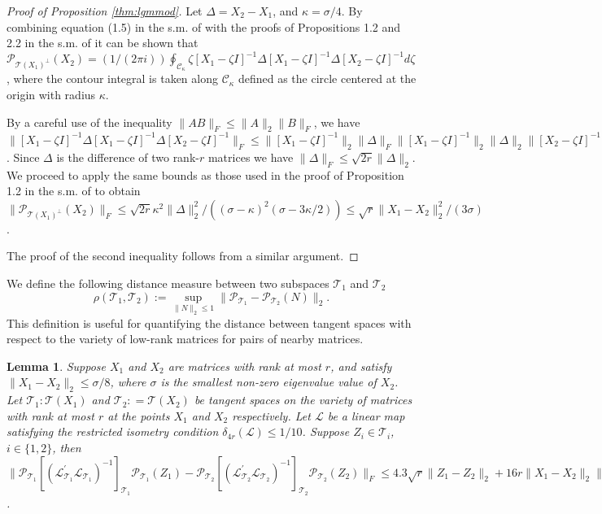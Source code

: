 \documentclass[11pt,letterpaper]{article}
\newtheorem{lemma}[theorem]{Lemma}
\newcommand{\ct}{\mathcal{T}}
\newcommand{\cp}{\mathcal{P}}
\begin{document}
\begin{proof} [Proof of Proposition \ref{thm:lgmmod}]
	Let $\Delta = X_2 - X_1$, and $\kappa = \sigma /4$.  By combining equation (1.5) in the s.m. of \cite{CPW:12} with the proofs of Propositions 1.2 and 2.2 in the s.m. of \cite{CPW:12} it can be shown that $ \cp_{\ct(X_1)^{\perp}} (X_2)  = (1/(2\pi i))\oint_{\mathcal{C}_{\kappa}} \zeta [X_1-\zeta I]^{-1} \Delta [X_1-\zeta I]^{-1} \Delta [X_2-\zeta I]^{-1} d \zeta $, where the contour integral is taken along $\mathcal{C}_{\kappa}$ defined as the circle centered at the origin with radius $\kappa$.
	
	By a careful use of the inequality $\|AB\|_F \leq \|A\|_2 \|B\|_F$, we have $\|[X_1-\zeta I]^{-1} \Delta [X_1-\zeta I]^{-1} \Delta [X_2-\zeta I]^{-1}\|_F \leq \|[X_1-\zeta I]^{-1}\|_2 \|\Delta \|_F \|[X_1-\zeta I]^{-1}\|_2 \|\Delta\|_2 \|[X_2-\zeta I]^{-1}\|_2$. Since $\Delta$ is the difference of two rank-$r$ matrices we have $\|\Delta\|_F \leq \sqrt{2r}\|\Delta \|_2$. We proceed to apply the same bounds as those used in the proof of Proposition 1.2 in the s.m. of \cite{CPW:12} to obtain $\|\cp_{\ct(X_1)^{\perp}}(X_2)\|_F \leq \sqrt{2r}\kappa^2 \|\Delta\|_2^2 / ((\sigma-\kappa)^2(\sigma - 3\kappa /2)) \leq \sqrt{r} \| X_1 - X_2 \|_2^2 / (3\sigma)$.
	
	The proof of the second inequality follows from a similar argument.
\end{proof}

We define the following distance measure between two subspaces $\ct_1$ and $\ct_2$ \cite{CPW:12}
\begin{equation*}
	\rho(\ct_1,\ct_2) := \underset{\|N\|_2 \leq 1}{\sup} \| \cp_{\ct_1}-\cp_{\ct_2}(N) \|_2.
\end{equation*}
This definition is useful for quantifying the distance between tangent spaces with respect to the variety of low-rank matrices for pairs of nearby matrices.

\begin{lemma}\label{thm:pertubationrestrictedlinearmap}
	Suppose $X_1$ and $X_2$ are matrices with rank at most $r$, and satisfy $\| X_1 - X_2 \|_2 \leq \sigma / 8$, where $\sigma$ is the smallest non-zero eigenvalue value of $X_2$. Let $\ct_1: \ct(X_1)$ and $\ct_2: = \ct(X_2)$ be tangent spaces on the variety of matrices with rank at most $r$ at the points $X_1$ and $X_2$ respectively. Let $\mathcal{L}$ be a linear map satisfying the restricted isometry condition $\delta_{4r}(\mathcal{L}) \leq 1/10$. Suppose $Z_i \in \ct_i$, $i \in \{1,2\}$, then $\|\cp_{\ct_1}[(\mathcal{L}^{\prime}_{\ct_1}\mathcal{L}_{\ct_1})^{-1}]_{\ct_1} \cp_{\ct_1} (Z_1) - \cp_{\ct_2}[(\mathcal{L}^{\prime}_{\ct_2}\mathcal{L}_{\ct_2})^{-1}]_{\ct_2} \cp_{\ct_2} (Z_2) \|_F \leq 4.3 \sqrt{r} \| Z_1 - Z_2\|_2 + 16 r\|X_1 - X_2 \|_2 \|Z_2 \|_2 / \sigma$.
\end{lemma}
\end{document}
